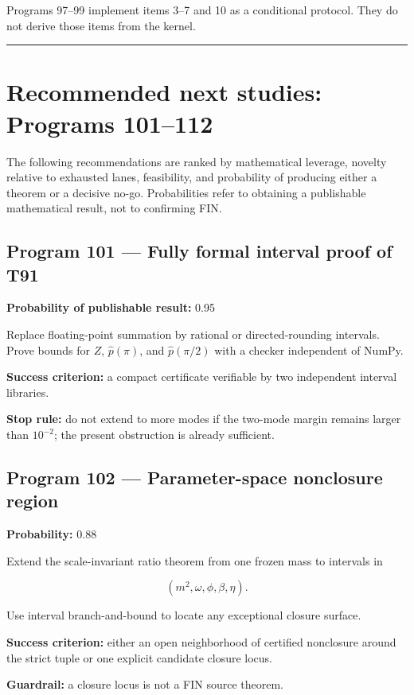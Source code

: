 \documentclass[11pt,a4paper,openany]{report}
\begin{document}
Programs 97--99 implement items 3--7 and 10 as a conditional protocol. They do not derive those items from the kernel.

\par\medskip\hrule\medskip

\chapter{Recommended next studies: Programs 101--112}

The following recommendations are ranked by mathematical leverage, novelty relative to exhausted lanes, feasibility, and probability of producing either a theorem or a decisive no-go. Probabilities refer to obtaining a publishable mathematical result, not to confirming FIN.

\section{Program 101 --- Fully formal interval proof of T91}

\textbf{Probability of publishable result:} 0.95

Replace floating-point summation by rational or directed-rounding intervals. Prove bounds for \(Z\), \(\widehat p(\pi)\), and \(\widehat p(\pi/2)\) with a checker independent of NumPy.

\textbf{Success criterion:} a compact certificate verifiable by two independent interval libraries.

\textbf{Stop rule:} do not extend to more modes if the two-mode margin remains larger than \(10^{-2}\); the present obstruction is already sufficient.

\section{Program 102 --- Parameter-space nonclosure region}

\textbf{Probability:} 0.88

Extend the scale-invariant ratio theorem from one frozen mass to intervals in

\[
(m^2,\omega,\phi,\beta,\eta).
\]

Use interval branch-and-bound to locate any exceptional closure surface.

\textbf{Success criterion:} either an open neighborhood of certified nonclosure around the strict tuple or one explicit candidate closure locus.

\textbf{Guardrail:} a closure locus is not a FIN source theorem.
\end{document}
